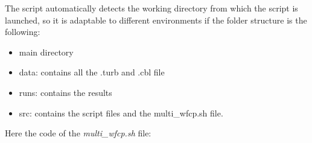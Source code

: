 \begin{appendices}
The script automatically detects the working directory from which the script is launched, so it is adaptable to different environments if the folder structure is the following:
\begin{itemize}
\item main directory
\item data: contains all the .turb and .cbl file
\item runs: contains the results 
\item src: contains the script files and the multi\_wfcp.sh file. 
\end{itemize}

Here the code of the \textit{multi\_wfcp.sh} file:
\newpage



\end{appendices}
